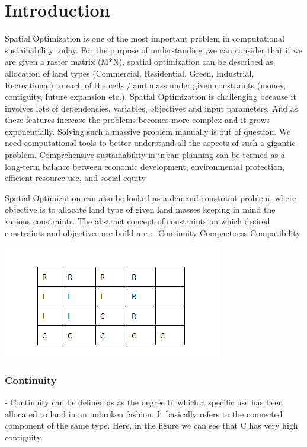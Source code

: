 \documentclass{sig-alternate}
\begin{document}
\section{Introduction}
Spatial Optimization is one of the most important problem in computational sustainability today. For the purpose of understanding ,we can consider that if we are given a raster matrix (M*N), spatial optimization can be described as allocation of land types (Commercial, Residential, Green, Industrial,  Recreational) to each of the cells /land mass under given constraints (money, contiguity, future expansion etc.).  Spatial Optimization is challenging because it involves lots of dependencies, variables, objectives and input parameters. And as these features increase the problems becomes more complex and it grows exponentially. Solving such a massive problem manually is out of question. We need computational tools to better understand all the aspects of such a gigantic problem.
Comprehensive sustainability in urban planning can be termed as a long-term balance between economic development, environmental protection, efficient resource use, and social equity


Spatial Optimization can also be looked as a demand-constraint problem, where objective is to allocate land type of given land masses keeping in mind the various constraints. The abstract concept of constraints on which  desired constraints and objectives are build are :-
Continuity
Compactness
Compatibility

\graphicspath{ {images/} }
\includegraphics{raster}

\subsubsection*{Continuity} - Continuity can be defined as as the degree to which a specific use has been allocated to land in an unbroken fashion. It basically refers to the connected component of the same type. Here, in the figure we can see that C has very high contiguity.
\end{document}

